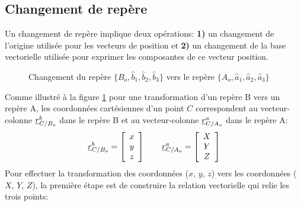 

\subsection{Changement de repère}
\label{sec:repchan}

Un changement de repère implique deux opérations: \textbf{1)} un changement de l'origine utilisée pour les vecteurs de position et \textbf{2)} un changement de la base vectorielle utilisée pour exprimer les composantes de ce vecteur position. 
\begin{figure}[htpb]
        \centering
				\hspace{10pt}
        \caption{Changement du repère $\{B_o,\hat{b}_1,\hat{b}_2,\hat{b}_3\}$ vers  le repère $\{A_o,\hat{a}_1,\hat{a}_2,\hat{a}_3\}$}
				\label{fig:repcha}
\end{figure}
Comme illustré à la figure \ref{fig:repcha} pour une transformation d'un repère B vers un repère A, les coordonnées cartésiennes d'un point $C$ correspondent au vecteur-colonne $\underline{r}_{C/B_o}^b$ dans le repère B et au vecteur-colonne $\underline{r}_{C/A_o}^a$ dans le repère A:
\begin{align}
\underline{r}_{C/B_o}^b = 
\left[ \begin{array}{c} 
x \\ y \\ z
\end{array} \right]  \quad \quad
\underline{r}_{C/A_o}^a = 
\left[ \begin{array}{c} 
X \\ Y \\ Z
\end{array} \right] 
\end{align} 
Pour effectuer la transformation des coordonnées ($x$, $y$, $z$) vers les coordonnées ($X$, $Y$, $Z$), la première étape est de construire la relation vectorielle qui relie les trois points:
